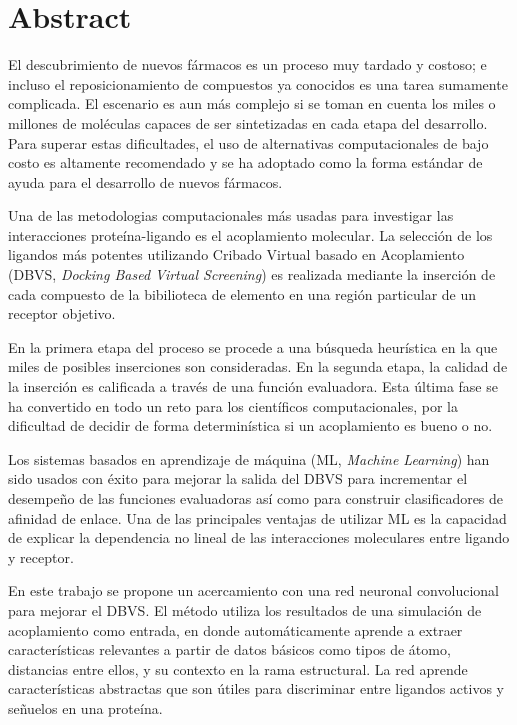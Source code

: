 \section{Abstract}
El descubrimiento de nuevos fármacos es un proceso muy tardado y
costoso; e incluso el reposicionamiento de compuestos ya conocidos es
una tarea sumamente complicada. El escenario es aun más complejo si
se toman en cuenta los miles o millones de moléculas capaces de ser
sintetizadas en cada etapa del desarrollo.  Para superar estas
dificultades, el uso de alternativas computacionales de bajo costo es
altamente recomendado y se ha adoptado como la forma estándar de
ayuda para el desarrollo de nuevos fármacos.

Una de las metodologias computacionales más usadas para investigar las
interacciones proteína-ligando es el acoplamiento molecular. La
selección de los ligandos más potentes utilizando Cribado Virtual
basado en Acoplamiento (DBVS, \textit{Docking Based Virtual
  Screening}) es realizada mediante la inserción de cada compuesto de
la bibilioteca de elemento en una región particular de un receptor
objetivo.

En la primera etapa del proceso se procede a una búsqueda heurística
en la que miles de posibles inserciones son consideradas. En la
segunda etapa, la calidad de la inserción es calificada a través de
una función evaluadora. Esta última fase se ha convertido en todo un
reto para los científicos computacionales, por la dificultad de
decidir de forma determinística si un acoplamiento es bueno o no.

Los sistemas basados en aprendizaje de máquina (ML, \textit{Machine
  Learning}) han sido usados con éxito para mejorar la salida del DBVS
para incrementar el desempeño de las funciones evaluadoras así como
para construir clasificadores de afinidad de enlace. Una de las
principales ventajas de utilizar ML es la capacidad de explicar la
dependencia no lineal de las interacciones moleculares entre ligando y
receptor.

En este trabajo se propone un acercamiento con una red neuronal
convolucional para mejorar el DBVS. El método utiliza los resultados
de una simulación de acoplamiento como entrada, en donde
automáticamente aprende a extraer características relevantes a partir
de datos básicos como tipos de átomo, distancias entre ellos, y su
contexto en la rama estructural. La red aprende características
abstractas que son útiles para discriminar entre ligandos activos y
señuelos en una proteína.
